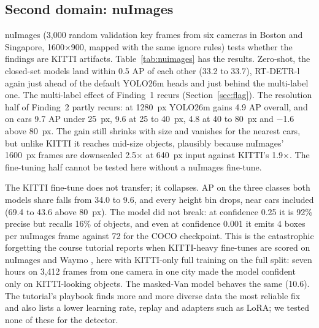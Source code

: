 \documentclass[conference]{IEEEtran}
\begin{document}
\subsection{Second domain: nuImages}
nuImages (3{,}000 random validation key frames from six cameras in Boston and Singapore, 1600$\times$900, mapped with
the same ignore rules) tests whether the findings are KITTI artifacts. Table~\ref{tab:nuimages} has the results.
Zero-shot, the closed-set models land within 0.5 AP of each other (33.2 to 33.7), RT-DETR-l again just ahead of the
default YOLO26m heads and just behind the multi-label one. The multi-label effect of Finding~1 recurs
(Section~\ref{sec:flag}). The resolution half of Finding~2 partly recurs: at 1280~px YOLO26m gains 4.9 AP overall,
and on cars 9.7 AP under 25~px, 9.6 at 25 to 40~px, 4.8 at 40 to 80~px and $-$1.6 above 80~px. The gain still
shrinks with size and vanishes for the nearest cars, but unlike KITTI it reaches mid-size objects, plausibly because
nuImages' 1600~px frames are downscaled 2.5$\times$ at 640~px input against KITTI's 1.9$\times$. The fine-tuning half
cannot be tested here without a nuImages fine-tune.

The KITTI fine-tune does not transfer; it collapses. AP on the three classes both models share falls from 34.0 to
9.6, and every height bin drops, near cars included (69.4 to 43.6 above 80~px). The model did not break: at
confidence 0.25 it is 92\% precise but recalls 16\% of objects, and even at confidence 0.001 it emits 4 boxes per
nuImages frame against 72 for the COCO checkpoint. This is the catastrophic forgetting the course tutorial reports
when KITTI-heavy fine-tunes are scored on nuImages and Waymo \cite[\S17.4]{liu2026ngdet}, here with KITTI-only
full training on the full split: seven hours on 3{,}412 frames from one camera in one city made the model confident
only on KITTI-looking objects. The masked-Van model behaves the same (10.6). The tutorial's playbook
\cite[\S18]{liu2026ngdet} finds more and more diverse data the most reliable fix and also lists a lower learning
rate, replay and adapters such as LoRA; we tested none of these for the detector.
\end{document}
